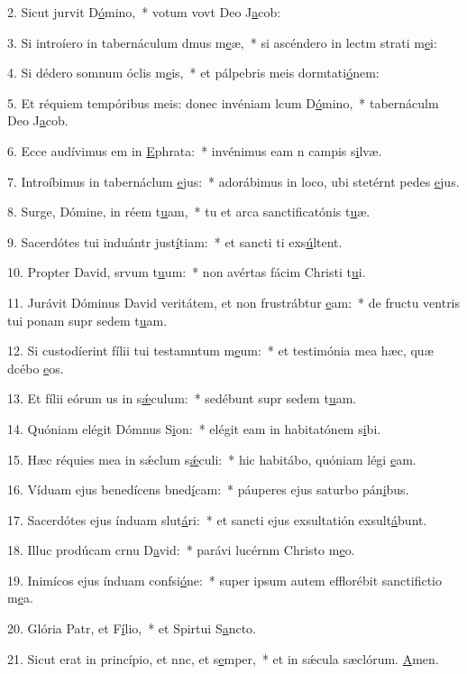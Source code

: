 2. Sicut jurvit D\uline{ó}mino,~* votum vovt Deo J\uline{a}cob:\par 
3. Si introíero in tabernáculum dmus m\uline{e}æ,~* si ascéndero in lectm strati m\uline{e}i:\par 
4. Si dédero somnum óclis m\uline{e}is,~* et pálpebris meis dormtati\uline{ó}nem:\par 
5. Et réquiem tempóribus meis: donec invéniam lcum D\uline{ó}mino,~* tabernáculm Deo J\uline{a}cob.\par 
6. Ecce audívimus em in \uline{E}phrata:~* invénimus eam n campis s\uline{i}lvæ.\par 
7. Introíbimus in tabernáclum \uline{e}jus:~* adorábimus in loco, ubi stetérnt pedes \uline{e}jus.\par 
8. Surge, Dómine, in réem t\uline{u}am,~* tu et arca sanctificatónis t\uline{u}æ.\par 
9. Sacerdótes tui induántr just\uline{í}tiam:~* et sancti ti exs\uline{ú}ltent.\par 
10. Propter David, srvum t\uline{u}um:~* non avértas fácim Christi t\uline{u}i.\par 
11. Jurávit Dóminus David veritátem, et non frustrábtur \uline{e}am:~* de fructu ventris tui ponam supr sedem t\uline{u}am.\par 
12. Si custodíerint fílii tui testamntum m\uline{e}um:~* et testimónia mea hæc, quæ dcébo \uline{e}os.\par 
13. Et fílii eórum us in s\uline{ǽ}culum:~* sedébunt supr sedem t\uline{u}am.\par 
14. Quóniam elégit Dómnus S\uline{i}on:~* elégit eam in habitatónem s\uline{i}bi.\par 
15. Hæc réquies mea in sǽclum s\uline{ǽ}culi:~* hic habitábo, quóniam légi \uline{e}am.\par 
16. Víduam ejus benedícens bned\uline{í}cam:~* páuperes ejus saturbo pán\uline{i}bus.\par 
17. Sacerdótes ejus índuam slut\uline{á}ri:~* et sancti ejus exsultatión exsult\uline{á}bunt.\par 
18. Illuc prodúcam crnu D\uline{a}vid:~* parávi lucérnm Christo m\uline{e}o.\par 
19. Inimícos ejus índuam confsi\uline{ó}ne:~* super ipsum autem efflorébit sanctifictio m\uline{e}a.\par 
20. Glória Patr, et F\uline{í}lio,~* et Spirtui S\uline{a}ncto.\par 
21. Sicut erat in princípio, et nnc, et s\uline{e}mper,~* et in sǽcula sæclórum. \uline{A}men.\par 
